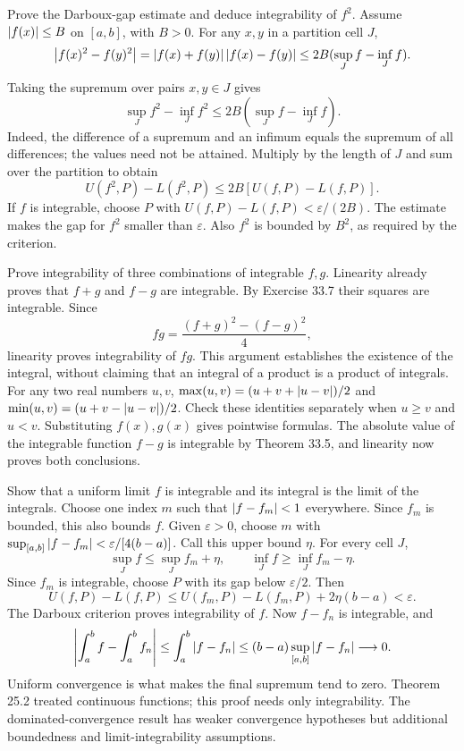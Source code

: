 \goal Prove the Darboux-gap estimate and deduce integrability of $f^2$.
Assume $\left|f(x)\right|\le B$ on $[a,b]$, with $B>0$.
For any $x,y$ in a partition cell $J$,
\[
 \left|f(x)^2-f(y)^2\right|
 =\left|f(x)+f(y)\right|\left|f(x)-f(y)\right|
 \le2B(\sup_J f-\inf_J f).
\]
Taking the supremum over pairs $x,y\in J$ gives
\[
 \sup_J f^2-\inf_J f^2\le2B(\sup_J f-\inf_J f).
\]
Indeed, the difference of a supremum and an infimum equals the
supremum of all differences; the values need not be attained.
Multiply by the length of $J$ and sum over the partition to obtain
\[
 U(f^2,P)-L(f^2,P)\le2B[U(f,P)-L(f,P)].
\]
If $f$ is integrable, choose $P$ with
$U(f,P)-L(f,P)<\varepsilon/(2B)$. The estimate makes the gap for
$f^2$ smaller than $\varepsilon$. Also $f^2$ is bounded by $B^2$,
as required by the criterion.

\goal Prove integrability of three combinations of integrable $f,g$.
Linearity already proves that $f+g$ and $f-g$ are integrable.
By Exercise 33.7 their squares are integrable. Since
\[
 fg=\frac{(f+g)^2-(f-g)^2}{4},
\]
linearity proves integrability of $fg$. This argument establishes the
existence of the integral, without claiming that an integral of a product
is a product of integrals.
For any two real numbers $u,v$,
$\max(u,v)=(u+v+\left|u-v\right|)/2$ and
$\min(u,v)=(u+v-\left|u-v\right|)/2$. Check these identities separately
when $u\ge v$ and $u<v$. Substituting $f(x),g(x)$ gives pointwise formulas.
The absolute value of the integrable function $f-g$ is integrable by
Theorem 33.5, and linearity now proves both conclusions.

\goal Show that a uniform limit $f$ is integrable and its integral is the
limit of the integrals.
Choose one index $m$ such that $\left|f-f_m\right|<1$ everywhere.
Since $f_m$ is bounded, this also bounds $f$.
Given $\varepsilon>0$, choose $m$ with
$\sup_{[a,b]}\left|f-f_m\right|<\varepsilon/[4(b-a)]$.
Call this upper bound $\eta$. For every cell $J$,
\[
 \sup_J f\le\sup_J f_m+\eta,\qquad
 \inf_J f\ge\inf_J f_m-\eta.
\]
Since $f_m$ is integrable, choose $P$ with its gap below $\varepsilon/2$.
Then
\[
 U(f,P)-L(f,P)
 \le U(f_m,P)-L(f_m,P)+2\eta(b-a)<\varepsilon.
\]
The Darboux criterion proves integrability of $f$.
Now $f-f_n$ is integrable, and
\[
 \left|\int_a^b f-\int_a^b f_n\right|
 \le\int_a^b\left|f-f_n\right|
 \le(b-a)\sup_{[a,b]}\left|f-f_n\right|\longrightarrow0.
\]
Uniform convergence is what makes the final supremum tend to zero.
Theorem 25.2 treated continuous functions; this proof needs only
integrability. The dominated-convergence result has weaker convergence
hypotheses but additional boundedness and limit-integrability assumptions.

